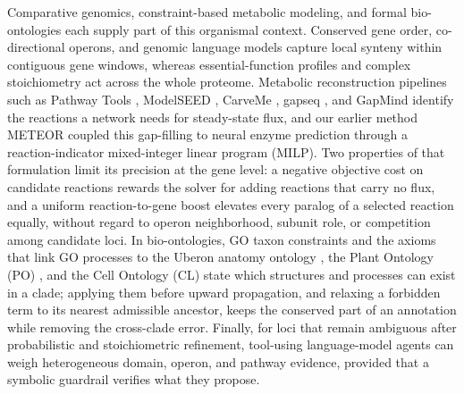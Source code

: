 \documentclass[10pt,twocolumn]{article}
\begin{document}
Comparative genomics, constraint-based metabolic modeling, and formal bio-ontologies each supply part of this organismal context. Conserved gene order, co-directional operons, and genomic language models \citep{dandekar1998conservation,overbeek1999use,pellegrini1999assigning,price2005novel,hwang2024genomic,cornman2024omg,toibazar2024context,wiatrak2025contextualised} capture local synteny within contiguous gene windows, whereas essential-function profiles and complex stoichiometry act across the whole proteome. Metabolic reconstruction pipelines such as Pathway Tools \citep{green2004bayesian}, ModelSEED \citep{seaver2021modelseed}, CarveMe \citep{machado2018fast}, gapseq \citep{zimmermann2021gapseq}, and GapMind \citep{price2020gapmind} identify the reactions a network needs for steady-state flux, and our earlier method METEOR \citep{niu2026meteor} coupled this gap-filling to neural enzyme prediction through a reaction-indicator mixed-integer linear program (MILP). Two properties of that formulation limit its precision at the gene level: a negative objective cost on candidate reactions rewards the solver for adding reactions that carry no flux, and a uniform reaction-to-gene boost elevates every paralog of a selected reaction equally, without regard to operon neighborhood, subunit role, or competition among candidate loci. In bio-ontologies, GO taxon constraints \citep{deegan2010formalization} and the axioms that link GO processes to the Uberon anatomy ontology \citep{mungall2011cross,mungall2012uberon}, the Plant Ontology (PO) \citep{cooper2013plant}, and the Cell Ontology (CL) \citep{diehl2016cell} state which structures and processes can exist in a clade; applying them before upward propagation, and relaxing a forbidden term to its nearest admissible ancestor, keeps the conserved part of an annotation while removing the cross-clade error. Finally, for loci that remain ambiguous after probabilistic and stoichiometric refinement, tool-using language-model agents \citep{wang2025_geneagent,caufield2024_spires} can weigh heterogeneous domain, operon, and pathway evidence, provided that a symbolic guardrail verifies what they propose.
\end{document}

